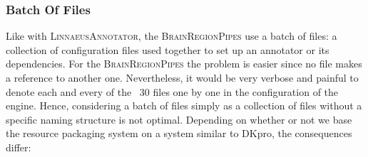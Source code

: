 \documentclass{article}
\newcommand{\ID}[1]{{\textsc{#1}}}
\begin{document}
\subsubsection{Batch Of Files}

Like with \ID{LinnaeusAnnotator}, the \ID{BrainRegionPipes} use a batch of files: a collection of
configuration files used together to set up an annotator or its dependencies. For the
\ID{BrainRegionPipes} the problem is easier since no file makes a reference to another one.
Nevertheless, it would be very verbose and painful to denote each and every of the ~30 files one by
one in the configuration of the engine. Hence, considering a batch of files simply as a collection
of files without a specific naming structure is not optimal. Depending on whether or not we base the
resource packaging system on a system similar to DKpro, the consequences differ:
\end{document}
